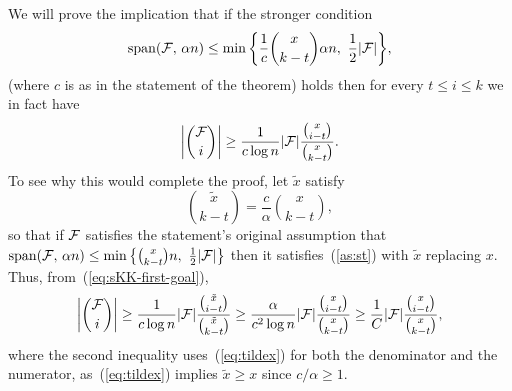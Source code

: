 \documentclass[11pt]{article}
\makeatletter
\renewenvironment{proof}[1][\proofname]
{\par\pushQED{\qed}
	\normalfont\topsep6\p@\@plus6\p@\relax\trivlist
	\item[\hskip\labelsep\bfseries#1\@addpunct{.}]
	\ignorespaces}
{\popQED\endtrivlist\@endpefalse}
\newcommand{\FF}{{\cal F}}
\renewcommand{\wp}{\mathrm{span}}
\renewcommand{\a}{\alpha}
\makeatother
\begin{document}

\newcommand{\reg}{_\text{reg}}

\begin{proof}[Proof of Theorem~\ref{th:skk}]
	We will prove the implication that if the stronger condition
	\begin{equation}\label{as:st}
	\wp(\FF,\,\a n) \le \min\bigg\{\frac{1}{c}\binom{x}{k-t}\a n,\,\, 
\frac12|\FF|\bigg\},
	\end{equation} 
	(where $c$ is as in the statement of the theorem) holds then for every $t \le i \le k$ we in fact have
	\begin{equation}\label{eq:sKK-first-goal}
	\bigg|\binom{\FF}{i}\bigg| \ge \frac{1}{c\log n}|\FF|\frac{\binom{x}{i-t}}{\binom{x}{k-t}} .
	\end{equation}
	To see why this would complete the proof, let $\tilde x$ satisfy 
	\begin {equation}
	\label {eq:tildex}
	\binom{\tilde x}{k-t} = \frac c \a \binom{x}{k-t},
	\end {equation} 
	so that if $\FF$ satisfies the statement's original assumption that $\wp(\FF,\,\a n) \le \min\big\{\binom{x}{k-t}n,\,\, \frac{1}{2}|\FF|\big\}$ then it satisfies~(\ref{as:st}) with $\tilde x$ replacing $x$.
	Thus, from~(\ref{eq:sKK-first-goal}),
	$$\bigg|\binom{\FF}{i}\bigg| \ge \frac{1}{c\log n}|\FF|\frac{\binom{\tilde x}{i-t}}{\binom{\tilde x}{k-t}} 
	\ge \frac{\a}{c^2\log n}|\FF|\frac{\binom{x}{i-t}}{\binom{x}{k-t}} 
	\ge \frac{1}{C}|\FF|\frac{\binom{x}{i-t}}{\binom{x}{k-t}} ,$$
	where the second inequality uses~(\ref{eq:tildex}) for both the denominator and the
numerator, as~(\ref{eq:tildex}) 
implies $\tilde x \ge x$ since $c/\a \ge 1$.
	

\end{proof}
\end{document}
